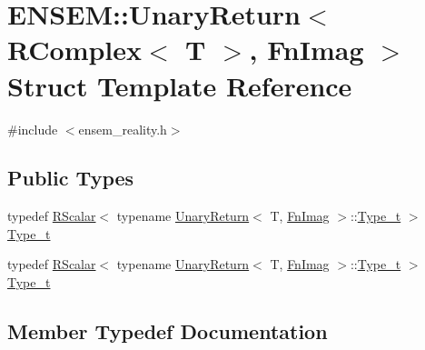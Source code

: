 \hypertarget{structENSEM_1_1UnaryReturn_3_01RComplex_3_01T_01_4_00_01FnImag_01_4}{}\section{E\+N\+S\+EM\+:\+:Unary\+Return$<$ R\+Complex$<$ T $>$, Fn\+Imag $>$ Struct Template Reference}
\label{structENSEM_1_1UnaryReturn_3_01RComplex_3_01T_01_4_00_01FnImag_01_4}


{\ttfamily \#include $<$ensem\+\_\+reality.\+h$>$}

\subsection*{Public Types}
\begin{DoxyCompactItemize}
\item 
typedef \mbox{\hyperlink{classENSEM_1_1RScalar}{R\+Scalar}}$<$ typename \mbox{\hyperlink{structENSEM_1_1UnaryReturn}{Unary\+Return}}$<$ T, \mbox{\hyperlink{structENSEM_1_1FnImag}{Fn\+Imag}} $>$\+::\mbox{\hyperlink{structENSEM_1_1UnaryReturn_3_01RComplex_3_01T_01_4_00_01FnImag_01_4_a5e8cda9513c7e5cb0b7182122bd82513}{Type\+\_\+t}} $>$ \mbox{\hyperlink{structENSEM_1_1UnaryReturn_3_01RComplex_3_01T_01_4_00_01FnImag_01_4_a5e8cda9513c7e5cb0b7182122bd82513}{Type\+\_\+t}}
\item 
typedef \mbox{\hyperlink{classENSEM_1_1RScalar}{R\+Scalar}}$<$ typename \mbox{\hyperlink{structENSEM_1_1UnaryReturn}{Unary\+Return}}$<$ T, \mbox{\hyperlink{structENSEM_1_1FnImag}{Fn\+Imag}} $>$\+::\mbox{\hyperlink{structENSEM_1_1UnaryReturn_3_01RComplex_3_01T_01_4_00_01FnImag_01_4_a5e8cda9513c7e5cb0b7182122bd82513}{Type\+\_\+t}} $>$ \mbox{\hyperlink{structENSEM_1_1UnaryReturn_3_01RComplex_3_01T_01_4_00_01FnImag_01_4_a5e8cda9513c7e5cb0b7182122bd82513}{Type\+\_\+t}}
\end{DoxyCompactItemize}


\subsection{Member Typedef Documentation}
\mbox{\label{structENSEM_1_1UnaryReturn_3_01RComplex_3_01T_01_4_00_01FnImag_01_4_a5e8cda9513c7e5cb0b7182122bd82513}} 
